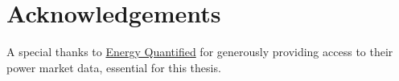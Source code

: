 \thispagestyle{plain}
\section*{Acknowledgements}

A special thanks to \href{https://www.energyquantified.com/}{Energy Quantified} for generously providing access to their power market data, essential for this thesis.
